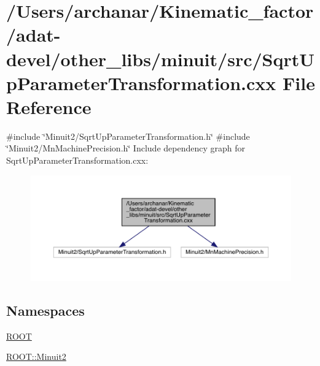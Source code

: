 \hypertarget{adat-devel_2other__libs_2minuit_2src_2SqrtUpParameterTransformation_8cxx}{}\section{/\+Users/archanar/\+Kinematic\+\_\+factor/adat-\/devel/other\+\_\+libs/minuit/src/\+Sqrt\+Up\+Parameter\+Transformation.cxx File Reference}
\label{adat-devel_2other__libs_2minuit_2src_2SqrtUpParameterTransformation_8cxx}
{\ttfamily \#include \char`\"{}Minuit2/\+Sqrt\+Up\+Parameter\+Transformation.\+h\char`\"{}}\newline
{\ttfamily \#include \char`\"{}Minuit2/\+Mn\+Machine\+Precision.\+h\char`\"{}}\newline
Include dependency graph for Sqrt\+Up\+Parameter\+Transformation.\+cxx\+:
\nopagebreak
\begin{figure}[H]
\begin{center}
\leavevmode
\includegraphics[width=350pt]{dd/d8e/adat-devel_2other__libs_2minuit_2src_2SqrtUpParameterTransformation_8cxx__incl}
\end{center}
\end{figure}
\subsection*{Namespaces}
\begin{DoxyCompactItemize}
\item 
 \mbox{\hyperlink{namespaceROOT}{R\+O\+OT}}
\item 
 \mbox{\hyperlink{namespaceROOT_1_1Minuit2}{R\+O\+O\+T\+::\+Minuit2}}
\end{DoxyCompactItemize}
